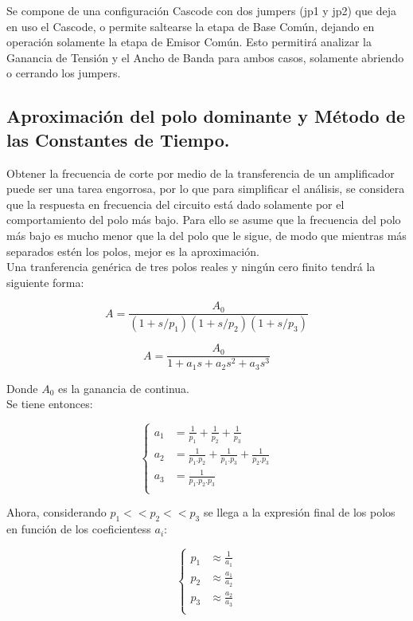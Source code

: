 \documentclass[letterpaper, 10 pt, conference]{ieeeconf}  %
\begin{document}
Se compone de una configuración Cascode con dos jumpers (jp1 y jp2) que deja en uso el Cascode, o permite saltearse la etapa de Base Común, dejando en operación solamente la etapa de Emisor Común.
Esto permitirá analizar la Ganancia de Tensión y el Ancho de Banda para ambos casos, solamente abriendo o cerrando los jumpers.

\subsection{\textbf{Aproximación del polo dominante y Método de las Constantes de Tiempo.}}

Obtener la frecuencia de corte por medio de la transferencia de un amplificador puede ser una tarea engorrosa, por lo que para simplificar el análisis, se considera que la respuesta en frecuencia del circuito está dado solamente por el comportamiento del polo más bajo.
Para ello se asume que la frecuencia del polo más bajo es mucho menor que la del polo que le sigue, de modo que mientras más separados estén los polos, mejor es la aproximación.\\
Una tranferencia genérica de tres polos reales y ningún cero finito tendrá la siguiente forma:

\begin{equation}
A = \frac{A_0}{(1+s/p_1)(1+s/p_2)(1+s/p_3)} 
\end{equation}

\begin{equation}
A = \frac{A_0}{1 + a_1s + a_2s^2 + a_3s^3}
\end{equation}

Donde $A_0$ es la ganancia de continua.\\
Se tiene entonces:

\begin{equation}
\left\{
\begin{aligned}
a_1 &= \frac{1}{p_1} + \frac{1}{p_2}  + \frac{1}{p_3} \\ 
a_2 &= \frac{1}{p_1.p_2} + \frac{1}{p_1.p_3} + \frac{1}{p_2.p_3}\\
a_3 &= \frac{1}{p_1.p_2.p_3}\\
\end{aligned}
\right.
\end{equation}

Ahora, considerando $p_1<<p_2<<p_3$ se llega a la expresión final de los polos en función de los coeficientess $a_i$:

\begin{equation}
\left\{
\begin{aligned}
p_1 &\approx \frac{1}{a_1}\\ 
p_2 &\approx \frac{a_1}{a_2} \\
p_3 &\approx \frac{a_2}{a_3}\\
\end{aligned}
\right.
\label{eq:aprox_polos}
\end{equation}
\end{document}
